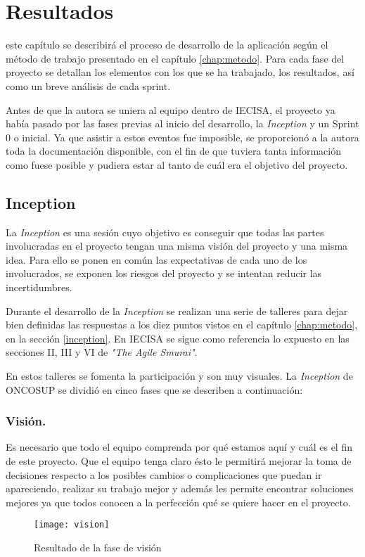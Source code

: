 \chapter{Resultados}
\label{chap:resultados}

 este capítulo se describirá el proceso de desarrollo de la aplicación según el método de trabajo presentado en el capítulo \ref{chap:metodo}. Para cada fase del proyecto se detallan los elementos con los que se ha trabajado, los resultados, así como un breve análisis de cada sprint.

Antes de que la autora se uniera al equipo dentro de IECISA, el proyecto ya había pasado por las fases previas al inicio del desarrollo, la \emph{Inception} y un Sprint 0 o inicial. Ya que asistir a estos eventos fue imposible, se proporcionó a la autora toda la documentación disponible, con el fin de que tuviera tanta información como fuese posible y pudiera estar al tanto de cuál era el objetivo del proyecto.


\section{Inception}
\label{sec:inception}
La \emph{Inception} es una sesión cuyo objetivo es conseguir que todas las partes involucradas en el proyecto tengan una misma visión del proyecto y una misma idea. Para ello se ponen en común las expectativas de cada uno de los involucrados, se exponen los riesgos del proyecto y se intentan reducir las incertidumbres.

Durante el desarrollo de la \emph{Inception} se realizan una serie de talleres para dejar bien definidas las respuestas a los diez puntos vistos en el capítulo \ref{chap:metodo}, en la sección \ref{inception}. En IECISA se sigue como referencia lo expuesto en las secciones II, III y VI de \emph{"The Agile Smurai"}.

En estos talleres se fomenta la participación y son muy visuales. La \emph{Inception} de ONCOSUP se dividió en cinco fases que se describen a continuación:

\subsection{Visión.}
\label{subsec:vision}


Es necesario que todo el equipo comprenda por qué estamos aquí y cuál es el fin de este proyecto. Que el equipo tenga claro ésto le permitirá mejorar la toma de decisiones respecto a los posibles cambios o complicaciones que puedan ir apareciendo, realizar su trabajo mejor y además les permite encontrar soluciones mejores ya que todos conocen a la perfección qué se quiere hacer en el proyecto. 
\clearpage
\begin{wrapfigure}{r}{0.40\textwidth} %
    \centering
    \texttt{[image: vision]}
    \caption{Resultado de la fase de visión}
    \label{fig:vision}
\end{wrapfigure}

